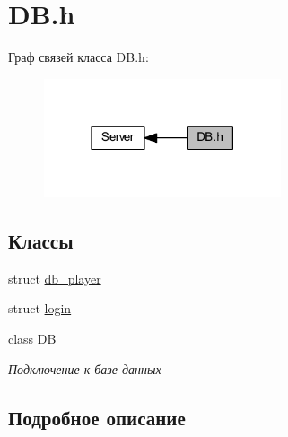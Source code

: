 \hypertarget{group__dbh}{}\section{D\+B.\+h}
\label{group__dbh}
Граф связей класса D\+B.\+h\+:
\nopagebreak
\begin{figure}[H]
\begin{center}
\leavevmode
\includegraphics[width=198pt]{group__dbh}
\end{center}
\end{figure}
\subsection*{Классы}
\begin{DoxyCompactItemize}
\item 
struct \mbox{\hyperlink{structdb__player}{db\+\_\+player}}
\item 
struct \mbox{\hyperlink{structlogin}{login}}
\item 
class \mbox{\hyperlink{class_d_b}{DB}}
\begin{DoxyCompactList}\small\item\em Подключение к базе данных \end{DoxyCompactList}\end{DoxyCompactItemize}


\subsection{Подробное описание}
